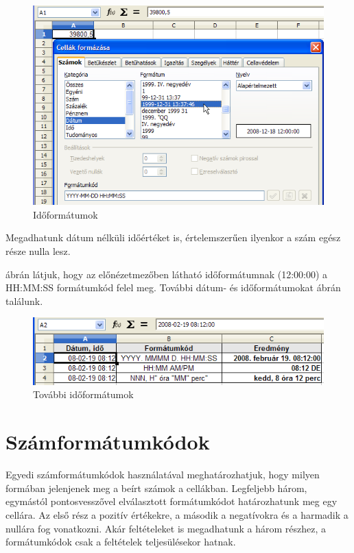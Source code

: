 \begin{figure}[!h]
\begin{center}
\includegraphics[width=15.027cm]{oocalcv1-img49.png}
\caption{Időformátumok}\label{Időformátumok}
\end{center}
\end{figure}
Megadhatunk dátum nélküli időértéket is,
értelemszerűen ilyenkor a szám egész része nulla lesz.

 ábrán látjuk, hogy az előnézetmezőben látható
időformátumnak (12:00:00) a HH:MM:SS formátumkód felel meg.
További dátum- és időformátumokat  ábrán
találunk.

\begin{figure}[!h]
\begin{center}
\includegraphics[width=13.995cm]{oocalcv1-img50.png}
\caption{További időformátumok}\label{TovábbiIdőformátumok}
\end{center}
\end{figure}

\clearpage
\section{Számformátumkódok}

Egyedi számformátumkódok használatával meghatározhatjuk,
hogy milyen formában jelenjenek meg a beírt számok a cellákban.
Legfeljebb három, egymástól pontosvesszővel elválasztott
formátumkódot határozhatunk meg egy cellára. Az első rész
a pozitív értékekre, a második a negatívokra és a harmadik
a nullára fog vonatkozni. Akár feltételeket is megadhatunk a
három részhez, a formátumkódok csak a feltételek
teljesülésekor hatnak.

